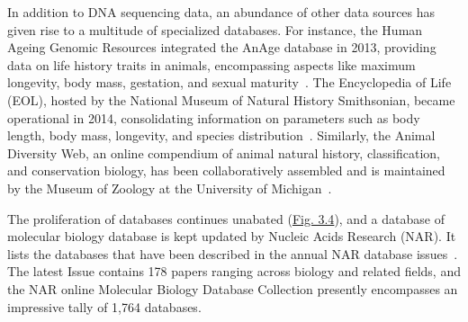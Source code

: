 In addition to DNA sequencing data, an abundance of other data sources has given rise to a multitude of specialized databases. For instance, the Human Ageing Genomic Resources integrated the AnAge database in 2013, providing data on life history traits in animals, encompassing aspects like maximum longevity, body mass, gestation, and sexual maturity~\citep{tacutu_human_2013, tacutu_human_2018}. The Encyclopedia of Life (EOL), hosted by the National Museum of Natural History Smithsonian, became operational in 2014, consolidating information on parameters such as body length, body mass, longevity, and species distribution~\citep{wilson_encyclopedia_2003, parr_encyclopedia_2014}. Similarly, the Animal Diversity Web, an online compendium of animal natural history, classification, and conservation biology, has been collaboratively assembled and is maintained by the Museum of Zoology at the University of Michigan~\citep{myers_animal_2023}.

The proliferation of databases continues unabated (\hyperref[fig:narbiodb]{Fig. 3.4}), and a database of molecular biology database is kept updated by Nucleic Acids Research (NAR). It lists the databases that have been described in the annual NAR database issues~\citep{rigden_2018_2018, rigden_2023_2023}. The latest Issue contains 178 papers ranging across biology and related fields, and the NAR online Molecular Biology Database Collection presently encompasses an impressive tally of 1,764 databases.

